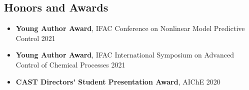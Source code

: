 \documentclass[letterpaper, 11pt]{article}
\begin{document}
\subsection*{Honors and Awards}
\begin{itemize}[leftmargin=*,itemsep=0pt]
\item[] {\bf Young Author Award}, IFAC Conference on Nonlinear Model Predictive Control \hfill 2021
\item[] {\bf Young Author Award}, IFAC International Symposium on Advanced Control of Chemical Processes \hfill 2021
\item[] {\bf CAST Directors' Student Presentation Award}, AIChE \hfill 2020

\end{itemize}
\end{document}
